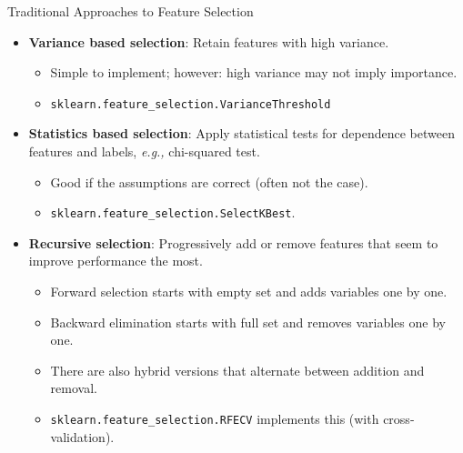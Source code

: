 \documentclass[10pt, aspectratio=169]{beamer} %
\begin{document}
\begin{frame}[fragile,allowframebreaks=0.8]{Traditional Approaches to Feature Selection}
\begin{itemize}
\item \textbf{Variance based selection}: Retain features with high variance. 
\begin{itemize}
	\item Simple to implement; however: high variance may not imply importance.
	\item \verb+sklearn.feature_selection.VarianceThreshold+
\end{itemize}
\item \textbf{Statistics based selection}: Apply statistical tests for dependence between features and labels, \emph{e.g.,} chi-squared test.
\begin{itemize}
	\item Good if the assumptions are correct (often not the case).
	\item \verb+sklearn.feature_selection.SelectKBest+.
\end{itemize}
\item \textbf{Recursive selection}: Progressively add or remove features that seem to improve performance the most.
\begin{itemize}
	\item Forward selection starts with empty set and adds variables one by one.
	\item Backward elimination starts with full set and removes variables one by one.
	\item There are also hybrid versions that alternate between addition and removal.
	\item \verb+sklearn.feature_selection.RFECV+ implements this (with cross-validation).
\end{itemize}
\end{itemize}
\end{frame}
\end{document}

